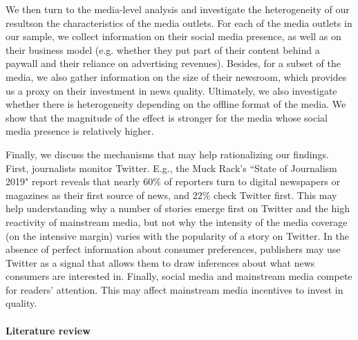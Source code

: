 We then turn to the media-level analysis and investigate the heterogeneity of our resultson the characteristics of the media outlets. For each of the media outlets in our sample, we collect information on their social media presence, as well as on their business model (e.g. whether they put part of their content behind a paywall and their reliance on advertising revenues). Besides, for a subset of the media, we also gather information on the size of their newsroom, which provides us a proxy on their investment in news quality. Ultimately, we also investigate whether there is heterogeneity depending on the offline format of the media. We show that the magnitude of the effect is stronger for the media whose social media presence is relatively higher.

Finally, we discuss the mechanisms that may help rationalizing our findings. First, journalists monitor Twitter. E.g., the Muck Rack’s  ``State of Journalism 2019" report reveals that nearly $60\%$ of reporters turn to digital newspapers or magazines as their first source of news, and $22\%$ check Twitter first. This may help understanding why a number of stories emerge first on Twitter and the high reactivity of mainstream media, but not why the intensity of the media coverage (on the intensive margin) varies with the popularity of a story on Twitter. In the absence of perfect information about consumer preferences, publishers may use Twitter as a signal that allows them to draw inferences about what news consumers are interested in. Finally, social media and mainstream media compete for readers' attention. This may affect mainstream media incentives to invest in quality.


\paragraph{Literature review}

